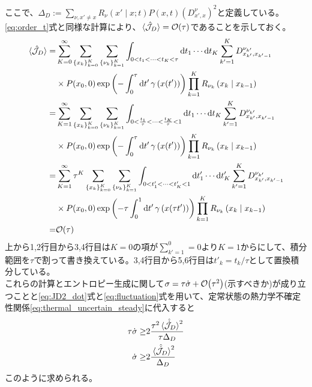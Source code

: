\documentclass{ltjsarticle}
\begin{document}
ここで、$\Delta_D:=\sum_{\nu,x'\neq x}R_{\nu}\left(x'\mid x;t\right)P(x,t)(D^{\nu}_{x',x})^2$と定義している。\\
\eqref{eq:order_t}式と同様な計算により、$\ev*{\hat{\mathcal{J}}_D}=\order{\tau}$であることを示しておく。\\
\begin{align}
  \ev*{\hat{\mathcal{J}}_D}
  =&\sum_{K=0}^{\infty}\sum_{\lbrace x_k\rbrace_{k=0}^K}\sum_{\lbrace\nu_k\rbrace_{k=1}^K}\int_{0<t_1<\cdots<t_K<\tau}\dd{t_1}\cdots \dd{t_K}\sum_{k'=1}^{K}D^{\nu_{k'}}_{x_{k'},x_{k'-1}}\\
  &\times P(x_0,0)\exp\left(-\int_0^\tau \dd{t'}\gamma\left(x(t')\right)\right)\prod_{k=1}^K R_{\nu_k}\left(x_k\mid x_{k-1}\right)\\
  =&\sum_{K=1}^{\infty}\sum_{\lbrace x_k\rbrace_{k=0}^K}\sum_{\lbrace\nu_k\rbrace_{k=1}^K}\int_{0<\frac{t_1}{\tau}<\cdots<\frac{t_K}{\tau}<1}\dd{t_1}\cdots \dd{t_K}\sum_{k'=1}^{K}D^{\nu_{k'}}_{x_{k'},x_{k'-1}}\\
  &\times P(x_0,0)\exp\left(-\int_0^\tau \dd{t'}\gamma\left(x(t')\right)\right)\prod_{k=1}^K R_{\nu_k}\left(x_k\mid x_{k-1}\right)\\
  =&\sum_{K=1}^{\infty}\tau^K\sum_{\lbrace x_k\rbrace_{k=0}^K}\sum_{\lbrace\nu_k\rbrace_{k=1}^K}\int_{0<t'_1<\cdots<t'_K<1}\dd{t'_1}\cdots \dd{t'_K}\sum_{k'=1}^{K}D^{\nu_{k'}}_{x_{k'},x_{k'-1}}\\
  &\times P(x_0,0)\exp\left(-\tau\int_0^1 \dd{t'}\gamma\left(x(\tau t')\right)\right)\prod_{k=1}^K R_{\nu_k}\left(x_k\mid x_{k-1}\right)\\
  =&\order{\tau}
\end{align}
上から1,2行目から3,4行目は$K=0$の項が$\sum_{k'=1}^0=0$より$K=1$からにして、積分範囲を$\tau$で割って書き換えている。3,4行目から5,6行目は$t'_k=t_k/\tau$として置換積分している。\\
これらの計算とエントロピー生成に関して$\sigma=\tau\dot{\sigma}+\order{\tau^2}$(示すべきか)が成り立つことと\eqref{eq:JD2_dot}式と\eqref{eq:fluctuation}式を用いて、定常状態の熱力学不確定性関係\eqref{eq:thermal_uncertain_steady}に代入すると
\begin{align}
  \tau \dot{\sigma}\ge&2\frac{\tau^2\ev*{\hat{\dot{\mathcal{J}}}_D}^2}{\tau \Delta_D}\\
  \dot{\sigma}\ge&2\frac{\ev*{\hat{\dot{\mathcal{J}}}_D}^2}{\Delta_D}\\
\end{align}
このように求められる。
\end{document}
